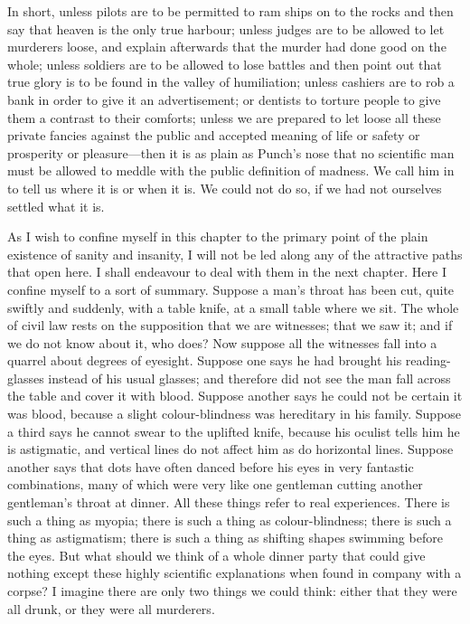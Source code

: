 \documentclass{book}
\begin{document}
In short, unless pilots are to be permitted to ram ships on to the rocks and then say that heaven is the only true harbour; unless judges are to be allowed to let murderers loose, and explain afterwards that the murder had done good on the whole; unless soldiers are to be allowed to lose battles and then point out that true glory is to be found in the valley of humiliation; unless cashiers are to rob a bank in order to give it an advertisement; or dentists to torture people to give them a contrast to their comforts; unless we are prepared to let loose all these private fancies against the public and accepted meaning of life or safety or prosperity or pleasure—then it is as plain as Punch’s nose that no scientific man must be allowed to meddle with the public definition of madness. We call him in to tell us where it is or when it is. We could not do so, if we had not ourselves settled what it is.

As I wish to confine myself in this chapter to the primary point of the plain existence of sanity and insanity, I will not be led along any of the attractive paths that open here. I shall endeavour to deal with them in the next chapter. Here I confine myself to a sort of summary. Suppose a man’s throat has been cut, quite swiftly and suddenly, with a table knife, at a small table where we sit. The whole of civil law rests on the supposition that we are witnesses; that we saw it; and if we do not know about it, who does? Now suppose all the witnesses fall into a quarrel about degrees of eyesight. Suppose one says he had brought his reading-glasses instead of his usual glasses; and therefore did not see the man fall across the table and cover it with blood. Suppose another says he could not be certain it was blood, because a slight colour-blindness was hereditary in his family. Suppose a third says he cannot swear to the uplifted knife, because his oculist tells him he is astigmatic, and vertical lines do not affect him as do horizontal lines. Suppose another says that dots have often danced before his eyes in very fantastic combinations, many of which were very like one gentleman cutting another gentleman’s throat at dinner. All these things refer to real experiences. There is such a thing as myopia; there is such a thing as colour-blindness; there is such a thing as astigmatism; there is such a thing as shifting shapes swimming before the eyes. But what should we think of a whole dinner party that could give nothing except these highly scientific explanations when found in company with a corpse? I imagine there are only two things we could think: either that they were all drunk, or they were all murderers.
\end{document}
